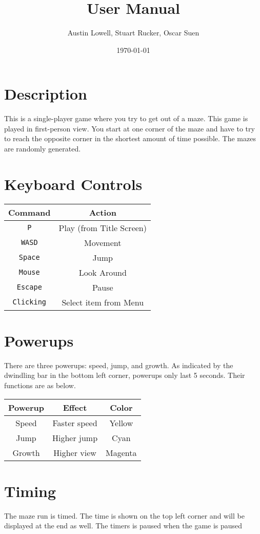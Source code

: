 \documentclass[12pt]{article}
\title{User Manual}
\author{Austin Lowell, Stuart Rucker, Oscar Suen}
\date{\today}
\begin{document}
\maketitle
\section{Description}
This is a single-player game where you try to get out of a maze.  This game is played in first-person view.  You start at one corner of the maze and have to try to reach the opposite corner in the shortest amount of time possible.  The mazes are randomly generated.

\section{Keyboard Controls}
\begin{tabular}{c | c}
Command & Action \\
\hline
\texttt{P} & Play (from Title Screen) \\
\texttt{WASD} & Movement \\
\texttt{Space} & Jump \\
\texttt{Mouse} & Look Around\\
\texttt{Escape} & Pause\\
\texttt{Clicking} & Select item from Menu\\
\end{tabular}

\section{Powerups}
There are three powerups: speed, jump, and growth. As indicated by the dwindling bar in the bottom left corner, powerups only last 5 seconds. Their functions are as below.

\begin{tabular}{c | c | c}
Powerup & Effect & Color \\
\hline
Speed & Faster speed & Yellow \\
Jump & Higher jump & Cyan\\
Growth & Higher view & Magenta
\end{tabular}

\section{Timing}
The maze run is timed.  The time is shown on the top left corner and will be displayed at the end as well. The timers is paused when the game is paused
\end{document}
